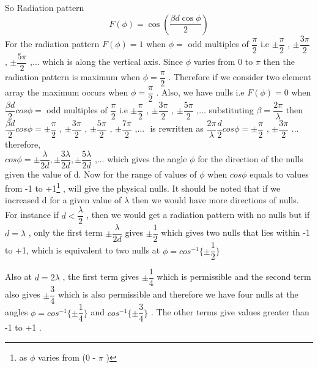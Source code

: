 So Radiation pattern
$$F(\phi) = \cos\left(\frac{\beta d\cos\phi}{2}\right)$$
For the radiation pattern $ F(\phi) = 1 $ when $\phi = $ odd multiples of $ \dfrac{\pi}{2} $ i.e $ \pm \dfrac{\pi}{2} $ , $ \pm \dfrac{3\pi}{2} $ , $ \pm \dfrac{5\pi}{2} $ ,... which is along the vertical axis. Since $ \phi $ varies from 0 to $ \pi $ then the radiation pattern is maximum when $ \phi = \dfrac{\pi}{2} $ . Therefore if we consider two element array the maximum occurs when $ \phi = \dfrac{\pi}{2} $ . Also, we have nulls i.e $ F(\phi) = 0 $ when $ \dfrac{\beta d}{2} cos\phi = $ odd multiples of $ \dfrac{\pi}{2} $  i.e  $ \pm \dfrac{\pi}{2} $ , $ \pm \dfrac{3\pi}{2} $ , $ \pm \dfrac{5\pi}{2} $ ,... substituting $ \beta = \dfrac{2\pi}{\lambda} $ then $ \dfrac{\beta d}{2} cos\phi = \pm \dfrac{\pi}{2} $ , $ \pm \dfrac{3\pi}{2} $ , $ \pm \dfrac{5\pi}{2} $ , $ \pm \dfrac{7\pi}{2} $ ,... $ $ is rewritten as $ \dfrac{2\pi}{\lambda} \dfrac{d}{2} cos \phi = \pm \dfrac{\pi}{2} $ , $ \pm \dfrac{3\pi}{2} $ ... therefore,
\\ $ cos \phi = \pm \dfrac{\lambda}{2d} , \pm \dfrac{3\lambda}{2d} , \pm \dfrac{5\lambda}{2d} $ ,... which gives the angle $ \phi $ for the direction of the nulls given the value of d. Now for the range of values of $ \phi $ when $ cos\phi $ equals to values from -1 to +1\footnote{as $ \phi $ varies from (0 - $ \pi $ )} , will give the physical nulls. It should be noted that if we increased d for a given value of $ \lambda $ then we would have more directions of nulls. For instance if $ d < \dfrac{\lambda}{2} $ , then we would get a radiation pattern with no nulls but if $ d = \lambda $ , only the first term $ \pm \dfrac{\lambda}{2d} $ gives $ \pm \dfrac{1}{2} $ which gives two nulls that lies within -1 to +1, which is equivalent to two nulls  at $ \phi = cos^{-1} \{\pm \dfrac{1}{2} \}  $ %

Also at $ d = 2 \lambda $ , the first term gives $ \pm \dfrac{1}{4} $ which is permissible and the second term also gives  $ \pm \dfrac{3}{4} $ which is also permissible  and therefore we have four nulls at the angles $ \phi = cos^{-1} \{\pm \dfrac{1}{4} \}  $ and $ cos^{-1} \{\pm \dfrac{3}{4} \}  $ . %
The other terms give values greater than -1 to +1 .

